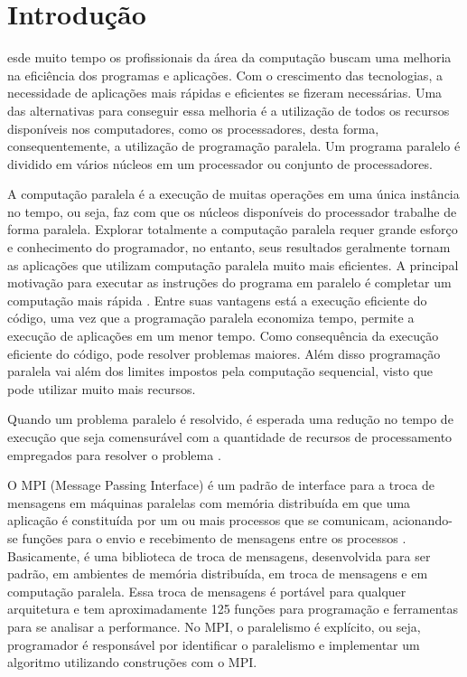 \documentclass[journal]{IEEEtran}
\begin{document}
\IEEEpeerreviewmaketitle



\section{Introdução}
esde muito tempo os profissionais da área da computação buscam uma melhoria na eficiência dos programas e aplicações. Com o crescimento das tecnologias, a necessidade de aplicações mais rápidas e eficientes se fizeram necessárias. Uma das alternativas para conseguir essa melhoria é a utilização de todos os recursos disponíveis nos computadores, como os processadores, desta forma, consequentemente, a utilização de programação paralela. Um programa paralelo é dividido em vários núcleos em um processador ou conjunto de processadores.

A computação paralela é a execução de muitas operações em uma única instância no tempo, ou seja, faz com que os núcleos disponíveis do  processador trabalhe de forma paralela. Explorar totalmente a computação paralela requer grande esforço e conhecimento do programador, no entanto, seus resultados geralmente tornam as aplicações que utilizam computação paralela muito mais eficientes. A principal motivação para executar as instruções do programa em paralelo é completar um
computação mais rápida \cite{lin}. Entre suas vantagens está a execução eficiente do código, uma vez que a programação paralela economiza tempo, permite a execução de aplicações em um menor tempo. Como consequência da execução eficiente do código, pode resolver problemas maiores. Além disso programação paralela vai além dos limites impostos pela computação sequencial, visto que pode utilizar muito mais recursos.

Quando um problema paralelo é resolvido, é esperada uma redução no tempo de execução que seja comensurável com a quantidade de recursos de processamento empregados para resolver o problema \cite{Kumar}. 

O MPI (Message Passing Interface) é um padrão de interface para a troca de mensagens em máquinas paralelas com memória distribuída em que uma aplicação é constituída por um ou mais processos que se comunicam, acionando-se funções para o envio e recebimento de mensagens entre os processos \cite{IGNACIO}. Basicamente, é uma biblioteca de troca de mensagens, desenvolvida para ser padrão, em ambientes de memória distribuída, em troca de mensagens e em computação paralela. Essa troca de mensagens é portável para qualquer arquitetura e tem aproximadamente 125 funções para
programação e ferramentas para se analisar a performance. No MPI, o paralelismo é explícito, ou seja, programador é responsável por identificar o paralelismo e implementar um algoritmo utilizando construções com o MPI.
\end{document}
